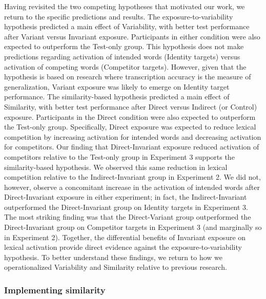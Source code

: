 \documentclass[
  12pt,
  twoside]{article}
\begin{document}
Having revisited the two competing hypotheses that motivated our work, we return to the specific predictions and results.
The exposure-to-variability hypothesis predicted a main effect of Variability, with better test performance after Variant versus Invariant exposure.
Participants in either condition were also expected to outperform the Test-only group.
This hypothesis does not make predictions regarding activation of intended words (Identity targets) versus activation of competing words (Competitor targets).
However, given that the hypothesis is based on research where transcription accuracy is the measure of generalization, Variant exposure was likely to emerge on Identity target performance.
The similarity-based hypothesis predicted a main effect of Similarity, with better test performance after Direct versus Indirect (or Control) exposure.
Participants in the Direct condition were also expected to outperform the Test-only group.
Specifically, Direct exposure was expected to reduce lexical competition by increasing activation for intended words and decreasing activation for competitors.
Our finding that Direct-Invariant exposure reduced activation of competitors relative to the Test-only group in Experiment 3 supports the similarity-based hypothesis.
We observed this same reduction in lexical competition relative to the Indirect-Invariant group in Experiment 2.
We did not, however, observe a concomitant increase in the activation of intended words after Direct-Invariant exposure in either experiment; in fact, the Indirect-Invariant outperformed the Direct-Invariant group on Identity targets in Experiment 3.
The most striking finding was that the Direct-Variant group outperformed the Direct-Invariant group on Competitor targets in Experiment 3 (and marginally so in Experiment 2).
Together, the differential benefits of Invariant exposure on lexical activation provide direct evidence against the exposure-to-variability hypothesis.
To better understand these findings, we return to how we operationalized Variability and Similarity relative to previous research.

\hypertarget{implementing-similarity}{%
\subsubsection{Implementing similarity}\label{implementing-similarity}}
\end{document}
